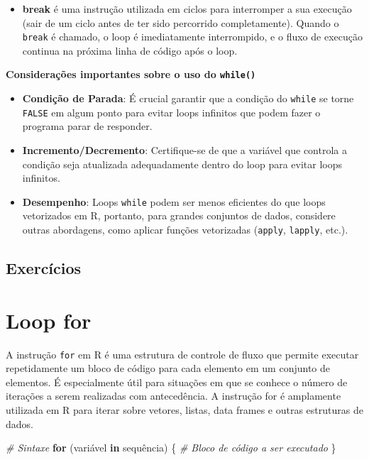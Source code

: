 \documentclass[
]{book}
\newenvironment{Shaded}{\begin{snugshade}}{\end{snugshade}}
\newcommand{\CommentTok}[1]{\textcolor[rgb]{0.56,0.35,0.01}{\textit{#1}}}
\newcommand{\ControlFlowTok}[1]{\textcolor[rgb]{0.13,0.29,0.53}{\textbf{#1}}}
\newcommand{\NormalTok}[1]{#1}
\providecommand{\tightlist}{%
  \setlength{\itemsep}{0pt}\setlength{\parskip}{0pt}}
\begin{document}
\begin{itemize}
\tightlist
\item
  \textbf{break} é uma instrução utilizada em ciclos para interromper a sua execução (sair de um ciclo antes de ter sido percorrido completamente). Quando o \texttt{break} é chamado, o loop é imediatamente interrompido, e o fluxo de execução continua na próxima linha de código após o loop.
\end{itemize}

\textbf{Considerações importantes sobre o uso do \texttt{while()}}

\begin{itemize}
\item
  \textbf{Condição de Parada}: É crucial garantir que a condição do \texttt{while} se torne \texttt{FALSE} em algum ponto para evitar loops infinitos que podem fazer o programa parar de responder.
\item
  \textbf{Incremento/Decremento}: Certifique-se de que a variável que controla a condição seja atualizada adequadamente dentro do loop para evitar loops infinitos.
\item
  \textbf{Desempenho}: Loops \texttt{while} podem ser menos eficientes do que loops vetorizados em R, portanto, para grandes conjuntos de dados, considere outras abordagens, como aplicar funções vetorizadas (\texttt{apply}, \texttt{lapply}, etc.).
\end{itemize}

\section{Exercícios}\label{exercuxedcios-7}

\chapter{Loop for}\label{loop-for}

A instrução \texttt{for} em R é uma estrutura de controle de fluxo que permite executar repetidamente um bloco de código para cada elemento em um conjunto de elementos. É especialmente útil para situações em que se conhece o número de iterações a serem realizadas com antecedência. A instrução for é amplamente utilizada em R para iterar sobre vetores, listas, data frames e outras estruturas de dados.

\begin{Shaded}
\begin{Highlighting}[]
\CommentTok{\# Sintaxe}
\ControlFlowTok{for}\NormalTok{ (variável }\ControlFlowTok{in}\NormalTok{ sequência) \{}
  \CommentTok{\# Bloco de código a ser executado}
\NormalTok{\}}
\end{Highlighting}
\end{Shaded}
\end{document}
